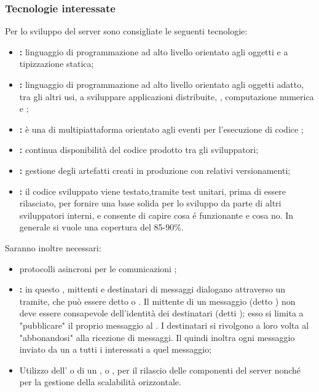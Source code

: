 	\subsubsection{Tecnologie interessate}
		Per lo sviluppo del server  sono consigliate le seguenti tecnologie:
		\begin{itemize}
			\item \textbf{:} linguaggio di programmazione ad alto livello orientato agli oggetti e a tipizzazione statica;
			\item \textbf{:} linguaggio di programmazione ad alto livello orientato agli oggetti adatto, tra gli altri usi, a sviluppare applicazioni distribuite, , computazione numerica e ;
			\item \textbf{:} è una  di   multipiattaforma orientato agli eventi per l'esecuzione di codice ;
			\item \textbf{:} continua disponibilità del codice prodotto tra gli sviluppatori;
			\item \textbf{:} gestione degli artefatti creati in produzione con relativi versionamenti;
			\item \textbf{:} il codice sviluppato viene testato,tramite test unitari, prima di essere rilasciato, per fornire una base solida per lo sviluppo da parte di altri sviluppatori interni, e consente di capire cosa é funzionante e cosa no. In generale si vuole una copertura del 85-90\%.
		\end{itemize}
		Saranno inoltre necessari:
		\begin{itemize}
			\item protocolli asincroni per le comunicazioni ;
			\item \textbf{:} in questo , mittenti e destinatari di messaggi dialogano attraverso un tramite, che può essere detto  o . Il mittente di un messaggio (detto ) non deve essere consapevole dell'identità dei destinatari (detti ); esso si limita a "pubblicare" il proprio messaggio al . I destinatari si rivolgono a loro volta al  "abbonandosi" alla ricezione di messaggi. Il  quindi inoltra ogni messaggio inviato da un  a tutti i  interessati a quel messaggio;
			\item Utilizzo dell’  o di un ,  o , per il rilascio delle componenti del server nonché per la gestione della scalabilità orizzontale.
		\end{itemize}

